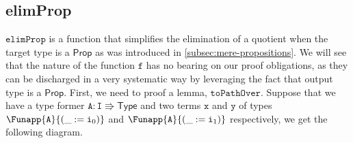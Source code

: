 \documentclass[12pt,twoside,maitrise]{dms}
\theoremstyle{definition}
\numberwithin{equation}{section}
\numberwithin{table}{chapter}
\numberwithin{figure}{chapter}
\newcommand\kw[1] {\textsf{#1}}
\newcommand\id[1] {\texttt{#1}}
\begin{document}
\subsection*{elimProp}
$\id{elimProp}$ is a function that simplifies the elimination of a quotient when
the target type is a $\kw{Prop}$ as was introduced in
\autoref{subsec:mere-propositions}. We will see that the nature of the function
$\id{f}$ has no bearing on our proof obligations, as they can be discharged in a
very systematic way by leveraging the fact that output type is a $\kw{Prop}$.
First, we need to proof a lemma, $\id{toPathOver}$. Suppose that we have a type
former $\id{A} : \id{I} \Rrightarrow \kw{Type}$ and two terms $\id{x}$ and
$\id{y}$ of types $\Funapp{\id{A}}{(\earg{\_}{\ileft})}$ and
$\Funapp{\id{A}}{(\earg{\_}{\iright})}$ respectively, we get the following
diagram.
\end{document}
